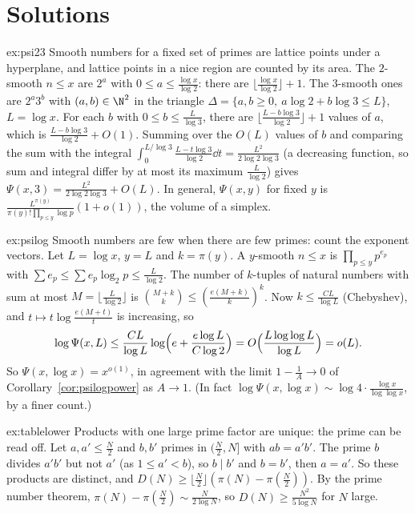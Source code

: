 \section{Solutions}

\begin{solution}{ex:psi23}
\idea Smooth numbers for a fixed set of primes are lattice points under a hyperplane, and lattice points in a nice region are counted by its area.
\writeup The $2$-smooth $n\le x$ are $2^a$ with $0\le a\le\frac{\log x}{\log2}$: there are $\lfloor\frac{\log x}{\log2}\rfloor+1$. The $3$-smooth ones are $2^a3^b$ with $(a,b)\in\N^2$ in the triangle $\Delta=\{a,b\ge0,\ a\log2+b\log3\le L\}$, $L=\log x$. For each $b$ with $0\le b\le\frac L{\log3}$, there are $\lfloor\frac{L-b\log3}{\log2}\rfloor+1$ values of $a$, which is $\frac{L-b\log3}{\log2}+O(1)$. Summing over the $O(L)$ values of $b$ and comparing the sum with the integral $\int_0^{L/\log3}\frac{L-t\log3}{\log2}\dd t=\frac{L^2}{2\log2\log3}$ (a decreasing function, so sum and integral differ by at most its maximum $\frac L{\log2}$) gives $\Psi(x,3)=\frac{L^2}{2\log2\log3}+O(L)$. In general, $\Psi(x,y)$ for fixed $y$ is $\frac{L^{\pi(y)}}{\pi(y)!\prod_{p\le y}\log p}(1+o(1))$, the volume of a simplex.
\end{solution}

\begin{solution}{ex:psilog}
\idea Smooth numbers are few when there are few primes: count the exponent vectors.
\writeup Let $L=\log x$, $y=L$ and $k=\pi(y)$. A $y$-smooth $n\le x$ is $\prod_{p\le y}p^{e_p}$ with $\sum e_p\le\sum e_p\log_2p\le\frac L{\log2}$. The number of $k$-tuples of natural numbers with sum at most $M=\lfloor\frac L{\log2}\rfloor$ is $\binom{M+k}k\le(\frac{e(M+k)}k)^k$. Now $k\le\frac{CL}{\log L}$ (Chebyshev), and $t\mapsto t\log\frac{e(M+t)}t$ is increasing, so
\[
\log\Psi(x,L)\le\frac{CL}{\log L}\log\Bigl(e+\frac{e\log L}{C\log2}\Bigr)=O\Bigl(\frac{L\log\log L}{\log L}\Bigr)=o(L).
\]
So $\Psi(x,\log x)=x^{o(1)}$, in agreement with the limit $1-\frac1A\to0$ of Corollary~\ref{cor:psilogpower} as $A\to1$. (In fact $\log\Psi(x,\log x)\sim\log4\cdot\frac{\log x}{\log\log x}$, by a finer count.)
\end{solution}

\begin{solution}{ex:tablelower}
\idea Products with one large prime factor are unique: the prime can be read off.
\writeup Let $a,a'\le\frac N2$ and $b,b'$ primes in $(\frac N2,N]$ with $ab=a'b'$. The prime $b$ divides $a'b'$ but not $a'$ (as $1\le a'<b$), so $b\mid b'$ and $b=b'$, then $a=a'$. So these products are distinct, and $D(N)\ge\lfloor\frac N2\rfloor(\pi(N)-\pi(\frac N2))$. By the prime number theorem, $\pi(N)-\pi(\frac N2)\sim\frac N{2\log N}$, so $D(N)\ge\frac{N^2}{5\log N}$ for $N$ large.
\end{solution}

